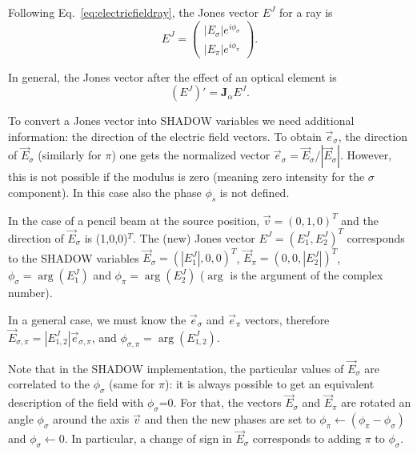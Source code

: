 \documentclass{iucr}
\begin{document}
Following Eq.~\ref{eq:electricfieldray}, the Jones vector $E^J$ for a ray is
\begin{equation}
    E^J = 
    \begin{pmatrix}
        |E_{\sigma}| e^{i \phi_\sigma} \\
        |E_{\pi}| e^{i \phi_\pi}
    \end{pmatrix}.
\end{equation}

In general, the Jones vector after the effect of an optical element is
\begin{equation}\label{eq:applyJones}
    (E^J)' = \textbf{J}_\alpha E^J.
\end{equation}

To convert a Jones vector into SHADOW variables we need additional information: the direction of the electric field vectors. To obtain $\vec{e}_\sigma$, the direction of $\vec{E}_\sigma$ (similarly for $\pi$) one gets the normalized vector $\vec{e}_\sigma=\vec{E}_\sigma/|\vec{E}_\sigma|$. However, this is not possible if the modulus is zero (meaning zero intensity for the $\sigma$ component). In this case also the phase $\phi_s$ is not defined. 

In the case of a pencil beam at the source position, $\vec{v}=(0,1,0)^T$ and the direction of $\vec{E}_\sigma$ is (1,0,0)$^T$. The (new) Jones vector $E^J=(E^J_1,E^J_2)^T$ corresponds to the SHADOW variables $\vec{E}_\sigma=(|E^J_1|,0,0)^T$, $\vec{E}_\pi=(0,0,|E^J_2|)^T$, $\phi_\sigma=\arg(E^J_1)$ and $\phi_\pi=\arg(E^J_2)$ ($\arg$ is the argument of the complex number).

In a general case, we must know the $\vec{e}_\sigma$ and $\vec{e}_\pi$ vectors, therefore $\vec{E}_{\sigma,\pi}=|E_{1,2}^J| \vec{e}_{\sigma,\pi}$, and $\phi_{\sigma,\pi}=\arg(E^J_{1,2 })$.



Note that in the SHADOW implementation, the particular values of $\vec{E}_\sigma$ are correlated to the $\phi_\sigma$ (same for $\pi$): it is always possible to get an equivalent description of the field with $\phi_\sigma$=0. For that, the vectors $\vec{E}_\sigma$ and $\vec{E}_\pi$ are rotated an angle $\phi_\sigma$ around the axis $\vec{v}$ and then the new phases are set to $\phi_\pi \xleftarrow{}(\phi_\pi-\phi_\sigma)$ and $\phi_\sigma\xleftarrow{}0$. In particular, a change of sign in $\vec{E}_\sigma$ corresponds to adding $\pi$ to $\phi_\sigma$.

\end{document}
